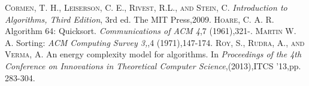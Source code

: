 \documentclass[a4paper,10pt,twocolumn]{article}
\begin{document}
\begin{thebibliography}{4}
\textsc{Cormen, T. H., Leiserson, C. E., Rivest, R.L., and Stein, C.}
\textit{Introduction to Algorithms, Third Edition}, 3rd ed. The MIT Press,2009.
\textsc{Hoare, C. A. R.} Algorithm 64: Quicksort.
\textit{Communications of ACM 4},7 (1961),321-.
\textsc{Martin} W. A. Sorting: 
\textit{ACM Computing Survey 3,},4 (1971),147-174.
\textsc{Roy, S., Rudra, A., and Verma, A.} An energy complexity model for algorithms. In
\textit{Proceedings
of the 4th Conference on Innovations in Theoretical Computer Science},(2013),ITCS '13,pp. 283-304.
\end{thebibliography}
\end{document}
